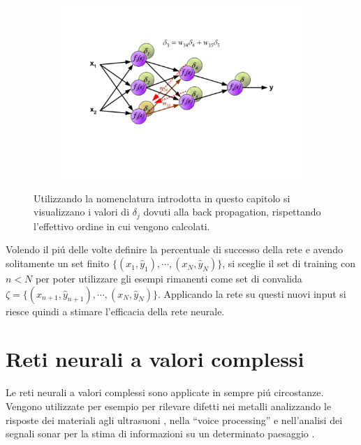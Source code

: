 \documentclass[a4paper,12pt]{report}
\begin{document}
\begin{figure}[h!]
\begin{subfigure}[b]{0.45\linewidth}
   \includegraphics[width=\linewidth]{BackPropf.png}
  \end{subfigure}
  \caption{Utilizzando la nomenclatura introdotta in questo capitolo si visualizzano i valori di $\delta_j$ dovuti alla back propagation, rispettando l'effettivo ordine in cui vengono calcolati.}
 \end{figure}
 Volendo il pi\'u delle volte definire la percentuale di successo della rete e avendo solitamente un set finito $\{(x_1,\widehat{y}_1), \cdots , (x_N,\widehat{y}_N)\}$, si sceglie il set di training con $n<N$ per poter utilizzare gli esempi rimanenti come set di convalida $\zeta = \{(x_{n+1},\widehat{y}_{n+1}), \cdots , (x_N,\widehat{y}_N)\}$. 
 Applicando la rete su questi nuovi input si riesce quindi a stimare l'efficacia della rete neurale.

 
 \chapter*{Reti neurali a valori complessi}
 Le reti neurali a valori complessi sono applicate in sempre pi\'u circostanze. 
 Vengono utilizzate per esempio per rilevare difetti nei metalli analizzando le risposte dei materiali agli ultrasuoni \cite{birx1993complex}, nella ``voice processing'' \cite{sawada2003polar} e nell'analisi dei segnali sonar per la stima di informazioni su un determinato paesaggio \cite{yamaki2008singular}.
 
 
\end{document}
